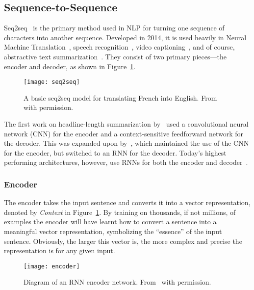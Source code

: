 \subsection{Sequence-to-Sequence}\label{seq2seq}
Seq2seq~\cite{Sutskever2014} is the primary method used in NLP for turning one sequence of characters into another sequence. Developed in 2014, it is used heavily in Neural Machine Translation~\cite{Bahdanau2014,Wu2016}, speech recognition~\cite{Bahdanau2016}, video captioning~\cite{Venugopalan2016}, and of course, abstractive text summarization~\cite{Rush2015,Chopra2016,Lopyrev2015,Liu2016,Nallapati2016a}. They consist of two primary pieces---the encoder and decoder, as shown in Figure~\ref{fig:seq2seq}.

\begin{figure}[h]
  \centering
  \texttt{[image: seq2seq]}
  \caption[Basic seq2seq model]{A basic seq2seq model for translating French into English. From~\cite{Robertson2017} with permission.}
  \label{fig:seq2seq}
\end{figure}

The first work on headline-length summarization by~\cite{Rush2015} used a convolutional neural network (CNN) for the encoder and a context-sensitive feedforward network for the decoder. This was expanded upon by~\cite{Chopra2016}, which maintained the use of the CNN for the encoder, but switched to an RNN for the decoder. Today's highest performing architectures, however, use RNNs for both the encoder and decoder~\cite{Hu2015,Nallapati2016a,Liu2016}.

\subsubsection{Encoder}
The encoder takes the input sentence and converts it into a vector representation, denoted by \textit{Context} in Figure~\ref{fig:seq2seq}. By training on thousands, if not millions, of examples the encoder will have learnt how to convert a sentence into a meaningful vector representation, symbolizing the ``essence'' of the input sentence. Obviously, the larger this vector is, the more complex and precise the representation is for any given input.

\begin{figure}[h]
  \centering
  \texttt{[image: encoder]}
  \caption[Seq2seq encoder diagram]{Diagram of an RNN encoder network. From~\cite{Robertson2017} with permission.}
  \label{fig:encoder}
\end{figure}

